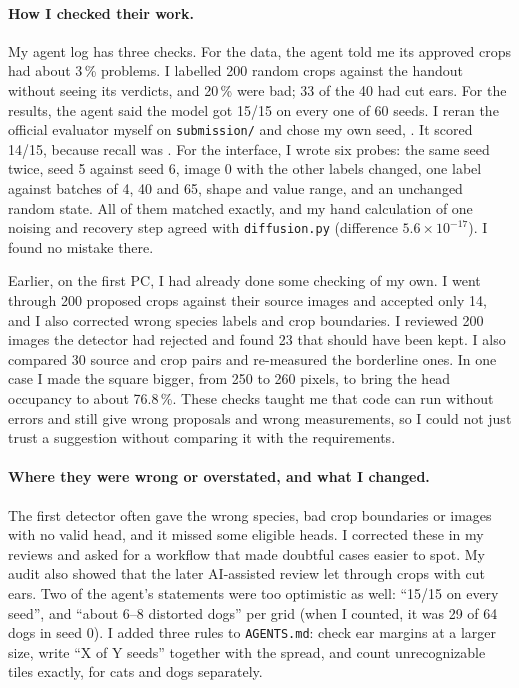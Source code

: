 \documentclass[10pt]{article}
\begin{document}
\paragraph{How I checked their work.} My agent log has three checks. For the data, the agent told me its approved crops had about 3\,\% problems. I labelled 200 random crops against the handout without seeing its verdicts, and 20\,\% were bad; 33 of the 40 had cut ears. For the results, the agent said the model got 15/15 on every one of 60 seeds. I reran the official evaluator myself on \texttt{submission/} and chose my own seed, \lowSeed{}. It scored 14/15, because recall was \lowRecall{}. For the interface, I wrote six probes: the same seed twice, seed 5 against seed 6, image 0 with the other labels changed, one label against batches of 4, 40 and 65, shape and value range, and an unchanged random state. All of them matched exactly, and my hand calculation of one noising and recovery step agreed with \texttt{diffusion.py} (difference $5.6{\times}10^{-17}$). I found no mistake there.

Earlier, on the first PC, I had already done some checking of my own. I went through 200 proposed crops against their source images and accepted only 14, and I also corrected wrong species labels and crop boundaries. I reviewed 200 images the detector had rejected and found 23 that should have been kept. I also compared 30 source and crop pairs and re-measured the borderline ones. In one case I made the square bigger, from 250 to 260 pixels, to bring the head occupancy to about 76.8\,\%. These checks taught me that code can run without errors and still give wrong proposals and wrong measurements, so I could not just trust a suggestion without comparing it with the requirements.

\paragraph{Where they were wrong or overstated, and what I changed.} The first detector often gave the wrong species, bad crop boundaries or images with no valid head, and it missed some eligible heads. I corrected these in my reviews and asked for a workflow that made doubtful cases easier to spot. My audit also showed that the later AI-assisted review let through crops with cut ears. Two of the agent's statements were too optimistic as well: ``15/15 on every seed'', and ``about 6--8 distorted dogs'' per grid (when I counted, it was 29 of 64 dogs in seed 0). I added three rules to \texttt{AGENTS.md}: check ear margins at a larger size, write ``X of Y seeds'' together with the spread, and count unrecognizable tiles exactly, for cats and dogs separately.
\end{document}
